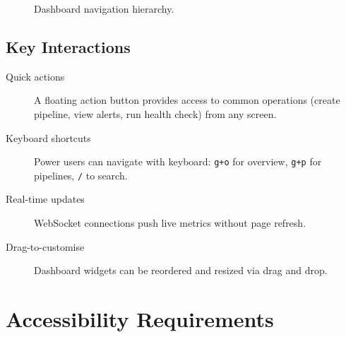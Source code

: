 \documentclass[
    language=english,
    doctype=technical-report,
    institution=none,
    titlestyle=book,
    oneside,
]{../../omnilatex}
\begin{document}
\begin{figure}[htbp]
    \centering
    \caption{Dashboard navigation hierarchy.}
    \label{fig:navigation}
\end{figure}

\section{Key Interactions}

\begin{description}
    \item[Quick actions] A floating action button provides access to
        common operations (create pipeline, view alerts, run health check)
        from any screen.
    \item[Keyboard shortcuts] Power users can navigate with keyboard:
        \texttt{g+o} for overview, \texttt{g+p} for pipelines,
        \texttt{/} to search.
    \item[Real-time updates] WebSocket connections push live metrics
        without page refresh.
    \item[Drag-to-customise] Dashboard widgets can be reordered and
        resized via drag and drop.
\end{description}

\chapter{Accessibility Requirements}
\label{sec:accessibility}
\end{document}
